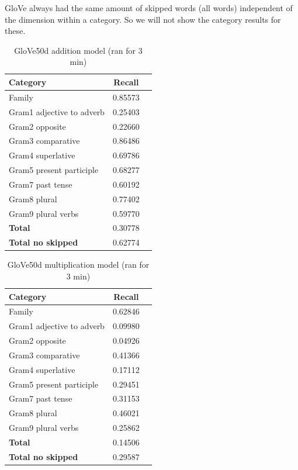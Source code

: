 GloVe always had the same amount of skipped words (all words) independent of the dimension within a category. So we will not show the category results for these.

\begin{table}[h!]
	\centering
\begin{tabular}{| l | c | r}
    	\hline
    	\textbf{Category} &    \textbf{Recall}\\ \hline
    	Family 						& 0.85573 \\
    	Gram1 adjective to adverb 	& 0.25403 \\
    	Gram2 opposite 				& 0.22660 \\
    	Gram3 comparative 			& 0.86486 \\
    	Gram4 superlative 			& 0.69786 \\
    	Gram5 present participle	& 0.68277 \\
    	Gram7 past tense 			& 0.60192 \\
    	Gram8 plural 				& 0.77402 \\
    	Gram9 plural verbs 			& 0.59770 \\
    	\textbf{Total}				& 0.30778 \\
    	\textbf{Total no skipped}	& 0.62774 \\ \hline
\end{tabular}
\caption{GloVe50d addition model (ran for 3 min)}
\label{table:glove50d_addition}
\end{table}

\begin{table}[h!]
	\centering
\begin{tabular}{| l | c | r}
    	\hline
    	\textbf{Category} &    \textbf{Recall}\\ \hline
    	Family 						& 0.62846 \\
    	Gram1 adjective to adverb 	& 0.09980 \\
    	Gram2 opposite 				& 0.04926 \\
    	Gram3 comparative 			& 0.41366 \\
    	Gram4 superlative 			& 0.17112 \\
    	Gram5 present participle	& 0.29451 \\
    	Gram7 past tense 			& 0.31153 \\
    	Gram8 plural 				& 0.46021 \\
    	Gram9 plural verbs 			& 0.25862 \\
    	\textbf{Total}				& 0.14506 \\
    	\textbf{Total no skipped}	& 0.29587 \\ \hline
\end{tabular}
\caption{GloVe50d multiplication model (ran for 3 min)}
\label{table:glove50d_addition}
\end{table}


